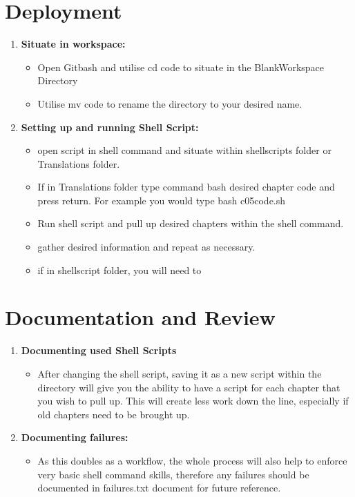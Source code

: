 \documentclass{article}
\begin{document}
\vspace{10mm}


\section{Deployment}

\begin{enumerate}
\item{\textbf{Situate in workspace:}}
\begin{itemize}
\item{Open Gitbash and utilise cd code to situate in the BlankWorkspace Directory}
\item{Utilise mv code to rename the directory to your desired name.}
\end{itemize}

\item{\textbf{Setting up and running Shell Script:}}

\begin{itemize}

\item{open script in shell command and situate within shellscripts folder or Translations folder.}
\item{If in Translations folder type command bash desired chapter code and press return. For example you would type bash c05code.sh}

\item{Run shell script and pull up desired chapters within the shell command.}
\item{gather desired information and repeat as necessary.}

\item{if in shellscript folder, you will need to }
\end{itemize}




\end{enumerate}


\section{Documentation and Review}

\begin{enumerate}
\item{\textbf{Documenting used Shell Scripts}}

\begin{itemize}
\item{After changing the shell script, saving it as a new script within the directory will give you the ability to have a script for each chapter that you wish to pull up. This will create less work down the line, especially if old chapters need to be brought up.}
\end{itemize}
\item{\textbf{Documenting failures:}}
\begin{itemize}
\item{As this doubles as a workflow, the whole process will also help to enforce very basic shell command skills, therefore any failures should be documented in failures.txt document for future reference.} 
\end{itemize}
\end{enumerate}
\end{document}

